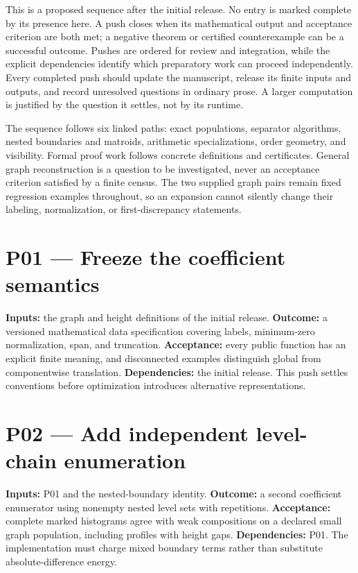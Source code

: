 \documentclass[
  11pt,
  a4paper,
]{report}
\begin{document}
This is a proposed sequence after the initial release. No entry is
marked complete by its presence here. A push closes when its
mathematical output and acceptance criterion are both met; a negative
theorem or certified counterexample can be a successful outcome. Pushes
are ordered for review and integration, while the explicit dependencies
identify which preparatory work can proceed independently. Every
completed push should update the manuscript, release its finite inputs
and outputs, and record unresolved questions in ordinary prose. A larger
computation is justified by the question it settles, not by its runtime.

The sequence follows six linked paths: exact populations, separator
algorithms, nested boundaries and matroids, arithmetic specializations,
order geometry, and visibility. Formal proof work follows concrete
definitions and certificates. General graph reconstruction is a question
to be investigated, never an acceptance criterion satisfied by a finite
census. The two supplied graph pairs remain fixed regression examples
throughout, so an expansion cannot silently change their labeling,
normalization, or first-discrepancy statements.

\hypertarget{p01-freeze-the-coefficient-semantics}{%
\section{P01 --- Freeze the coefficient
semantics}\label{p01-freeze-the-coefficient-semantics}}

\textbf{Inputs:} the graph and height definitions of the initial
release. \textbf{Outcome:} a versioned mathematical data specification
covering labels, minimum-zero normalization, span, and truncation.
\textbf{Acceptance:} every public function has an explicit finite
meaning, and disconnected examples distinguish global from componentwise
translation. \textbf{Dependencies:} the initial release. This push
settles conventions before optimization introduces alternative
representations.

\hypertarget{p02-add-independent-level-chain-enumeration}{%
\section{P02 --- Add independent level-chain
enumeration}\label{p02-add-independent-level-chain-enumeration}}

\textbf{Inputs:} P01 and the nested-boundary identity. \textbf{Outcome:}
a second coefficient enumerator using nonempty nested level sets with
repetitions. \textbf{Acceptance:} complete marked histograms agree with
weak compositions on a declared small graph population, including
profiles with height gaps. \textbf{Dependencies:} P01. The
implementation must charge mixed boundary terms rather than substitute
absolute-difference energy.
\end{document}
